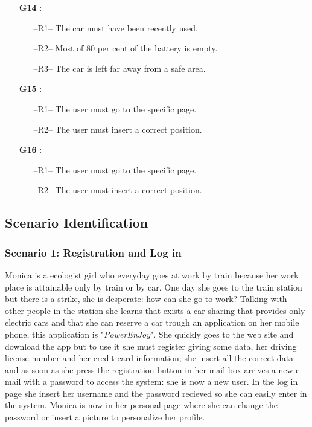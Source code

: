 \begin{itemize}
\item[\textbf{G14}]:
\begin{itemize}
\item[--R1--] The car must have been recently used.
\item[--R2--] Most of 80 per cent of the battery is empty.
\item[--R3--] The car is left far away from a safe area.
\end{itemize}


\item[\textbf{G15}]:
\begin{itemize}
\item[--R1--] The user must go to the specific page.
\item[--R2--] The user must insert a correct position. 
\end{itemize}


\item[\textbf{G16}]:
\begin{itemize}
\item[--R1--] The user must go to the specific page.
\item[--R2--] The user must insert a correct position.
\end{itemize}
\end{itemize}

\subsection{Scenario Identification} \label{sec:scenarios}
\subsubsection{Scenario 1: Registration and Log in} \label{sce1}
Monica is a ecologist girl who everyday goes at work by train because her work place is attainable only by train or by car. One day she goes to the train station but there is a strike, she is desperate: how can she go to work? Talking with other people in the station she learns that exists a car-sharing that provides only electric cars and that she can reserve a car trough an application on her mobile phone, this application is "\textit{PowerEnJoy}". She quickly goes to the web site and download the app but to use it she must register giving some data, her driving license number and her credit card information; she insert all the correct data and as soon as she press the registration button in her mail box arrives a new e-mail with a password to access the system: she is now a new user. In the log in page she insert her username and the password recieved so she can easily enter in the system. Monica is now in her personal page where she can change the password or insert a picture to personalize her profile.
